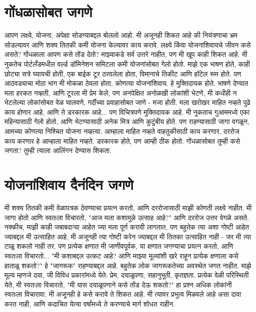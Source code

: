 \chapter{गोंधळासोबत जगणे}
आपण लक्ष्ये, योजना, अपेक्षा सोडण्याबद्दल बोललो आहो. मी अजूनही शिकत आहे की नियंत्रणाचा भ्रम सोडल्यावर आणि शक्य तितकी कमी योजना केल्यावर काय करावे.
लक्ष्ये किंवा योजनांशिवायचे जीवन कसे असते? गोंधळाला आपण कसे तोंड देतो?
माझ्याकडे सर्व उत्तरे नाहीत, पण मी खूप काही शिकत आहे.
मी नुकतेच पोर्टलँडमधील वर्ल्ड डॉमिनेशन समिटला कमी योजनांसोबत गेलो होतो. माझे एक भाषण होते, काही छोट्या सत्रे घ्यायची होती, एक बाईक टूर ठरवलेला होता, विमानाचे तिकीट आणि हॉटेल रूम होते. पण आठवड्याचा मोठा भाग मी मोकळा ठेवला होता, कोणत्या योजनांशिवाय.
हे मुक्तिदायक होते. भाषणे देण्यात मला हरकत नव्हती, आणि टूरला मी प्रेम केले, पण अनपेक्षित अनोळखी लोकांशी भेटणे, मी कधीही न भेटलेल्या लोकांसोबत वेळ घालवणे, गर्दीच्या प्रवाहासोबत जाणे - मजा होती. मला खरोखर माहित नव्हते पुढे काय होणार आहे, आणि ते डरकारक आहे... पण विचित्रपणे मुक्तिदायक आहे.
मी नुकताच गुआममध्ये एका महिन्यासाठी गेलो होतो, आणि भेटण्यासाठी अनेक मित्र आणि कुटुंबीय होते. पण राहण्यासाठी जागा वगळून, आमच्या कोणत्या निश्चित योजना नव्हत्या. आम्हाला माहित नव्हते वाहतुकीसाठी काय करणार, दररोज काय करणार हे आम्हाला माहित नव्हते. डरकारक होते, पण आम्ही ठीक होतो.
गोंधळासोबत तुम्ही कसे जगता?
तुम्ही त्याला आलिंगन देण्यास शिकता.

\chapter{योजनांशिवाय दैनंदिन जगणे}
मी शक्य तितकी कमी वेळापत्रक ठेवण्याचा प्रयत्न करतो, आणि दररोजासाठी माझी कोणती लक्ष्ये नाहीत. मी जागा होतो आणि स्वतःला विचारतो, "आज मला कशामुळे उत्साह आहे?" आणि दररोज उत्तर वेगळे असते.
नक्कीच, माझी काही जबाबदाऱ्या आहेत ज्या मला पूर्ण करावी लागतात, पण बहुतेक त्या अशा गोष्टी आहेत ज्याबद्दल मी उत्साहित आहे. मी अजूनही त्या गोष्टी करेन ज्याबद्दल मी तितका उत्साहित नाही - जर मी त्या टाळू शकलो नाही तर.
पण प्रत्येक क्षणात मी जाणीवपूर्वक, या क्षणात जगण्याचा प्रयत्न करतो, आणि स्वतःला विचारतो... "मी कशाबद्दल उत्कट आहे? आणि माझ्या मूल्यांशी खरे राहून प्रत्येक क्षणाला कसे हाताळू शकतो?" हे "जागरूक" राहण्याबद्दल आहे. बहुतेक लोक जागरूकतेच्या अवस्थेत जगत नाहीत.
माझे मूल्य म्हणजे दया, जी विविध प्रकारांमध्ये येते: प्रेम, दयाळूपणा, सहानुभूती, कृतज्ञता. प्रत्येक वेळी परिस्थिती येते, मी स्वतःला विचारतो, "मी यास दयाळूपणाने कसे तोंड देऊ शकतो?" हा प्रश्न अधिक लोकांनी स्वतःला विचारावा.
मी अजूनही हे कसे करावे ते शिकत आहे. मी त्यावर प्रभुत्व मिळवले आहे असा दावा करत नाही, आणि कदाचित येत्या वर्षांमध्ये ते करण्याचे मार्ग शोधत राहीन.

